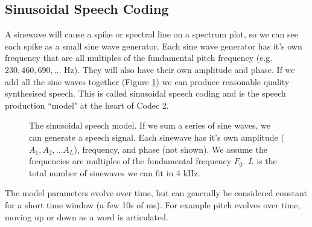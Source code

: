 \documentclass{article}
\begin{document}
{\subsection{Sinusoidal Speech Coding}

A sinewave will cause a spike or spectral line on a spectrum plot, so we can see each spike as a small sine wave generator.  Each sine wave generator has it's own frequency that are all multiples of the fundamental pitch frequency (e.g. $230, 460, 690,...$ Hz).  They will also have their own amplitude and phase.  If we add all the sine waves together (Figure \ref{fig:sinusoidal_model}) we can produce reasonable quality synthesised speech.  This is called sinusoidal speech coding and is the speech production ``model" at the heart of Codec 2.

\begin{figure}[h]
\caption{The sinusoidal speech model.  If we sum a series of sine waves, we can generate a speech signal.  Each sinewave has it's own amplitude ($A_1,A_2,... A_L$), frequency, and phase (not shown).  We assume the frequencies are multiples of the fundamental frequency $F_0$. $L$ is the total number of sinewaves we can fit in 4 kHz.}
\label{fig:sinusoidal_model}
\begin{center}
\end{center}
\end{figure}

The model parameters evolve over time, but can generally be considered constant for a short time window (a few 10s of ms).  For example pitch evolves over time, moving up or down as a word is articulated.

}
\end{document}

